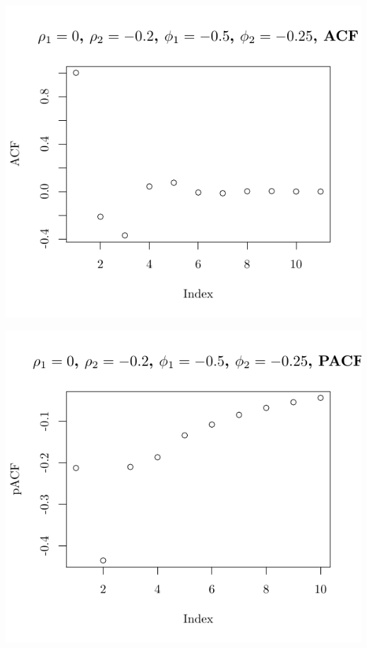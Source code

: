 \documentclass[10pt]{paper}\usepackage[]{graphicx}\usepackage[]{color}
\makeatletter
\def\maxwidth{ %
  \ifdim\Gin@nat@width>\linewidth
    \linewidth
  \else
    \Gin@nat@width
  \fi
}
\newenvironment{knitrout}{}{} %
\makeatother
\begin{document}
\begin{knitrout}
{\centering \includegraphics[width=\maxwidth]{figure/graphics-plotter-65} 

}




{\centering \includegraphics[width=\maxwidth]{figure/graphics-plotter-66} 

}





\end{knitrout}
\end{document}
